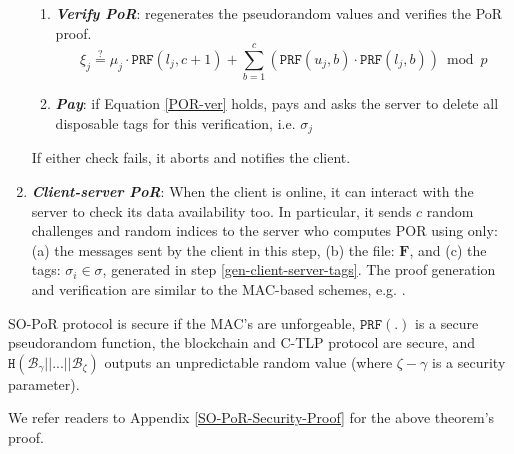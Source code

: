 \begin{enumerate}[leftmargin=.46cm]
\begin{enumerate}
\item\label{verify-PoR}\textbf{\textit{\small {Verify PoR}}}: regenerates the pseudorandom values and verifies the PoR proof.  
\begin{equation}\label{POR-ver}\xi_{\scriptscriptstyle j}\stackrel{\scriptscriptstyle ?}=\mu_{\scriptscriptstyle j}  \cdot\mathtt{PRF}(l_{\scriptscriptstyle j},c+1)+\sum\limits^{\scriptscriptstyle c}_{\scriptscriptstyle b=1} ( \mathtt{PRF}(u_{\scriptscriptstyle j},b)\cdot \mathtt{PRF}(l_{\scriptscriptstyle j},b))\bmod p
\end{equation}
\item\textbf{\textit{\small {Pay}}}: if  Equation \ref{POR-ver} holds, pays and asks the server to delete all disposable tags for this verification, i.e. $\sigma_{\scriptscriptstyle j}$
\end{enumerate}
If either check fails, it aborts and notifies the client. 


\item \textit{\textbf{Client-server PoR}}: When the client is online, it can   interact  with the server  to check its data availability too. In particular, it sends $c$ random challenges and random indices to the server who computes POR using only: (a) the  messages sent by the client in this step, (b) the  file: ${\bm{F}}$, and (c) the tags:  $\sigma_{\scriptscriptstyle i}\in\sigma$, generated in step \ref{gen-client-server-tags}.  The proof generation and verification are similar to the MAC-based schemes, e.g.  \cite{DBLP:conf/asiacrypt/ShachamW08}. 
\end{enumerate}


\begin{theorem}\label{PoR-main-theorem} SO-PoR protocol is secure  if the MAC's are unforgeable, $\mathtt{PRF}(.)$ is a secure pseudorandom function, the blockchain and C-TLP protocol are secure, and $ \mathtt{H}( \mathcal {B}_{\scriptscriptstyle \gamma}||...||  \mathcal {B}_{\scriptscriptstyle \zeta})$ outputs an unpredictable random value (where $\zeta-\gamma$ is a security parameter).
\end{theorem}

\begin{remark}
We refer readers to Appendix \ref{SO-PoR-Security-Proof} for the above theorem's proof.
\end{remark}




